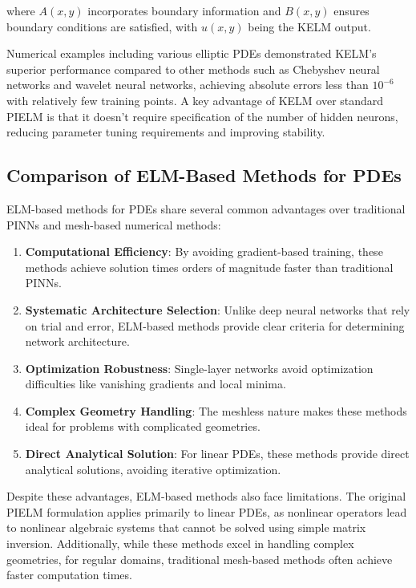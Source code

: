\documentclass[11pt]{article}
\begin{document}
where $A(x,y)$ incorporates boundary information and $B(x,y)$ ensures boundary conditions are satisfied, with $u(x,y)$ being the KELM output.

Numerical examples including various elliptic PDEs demonstrated KELM's superior performance compared to other methods such as Chebyshev neural networks and wavelet neural networks, achieving absolute errors less than $10^{-6}$ with relatively few training points. A key advantage of KELM over standard PIELM is that it doesn't require specification of the number of hidden neurons, reducing parameter tuning requirements and improving stability.

\subsection{Comparison of ELM-Based Methods for PDEs}

ELM-based methods for PDEs share several common advantages over traditional PINNs and mesh-based numerical methods:

\begin{enumerate}
    \item \textbf{Computational Efficiency}: By avoiding gradient-based training, these methods achieve solution times orders of magnitude faster than traditional PINNs.
    
    \item \textbf{Systematic Architecture Selection}: Unlike deep neural networks that rely on trial and error, ELM-based methods provide clear criteria for determining network architecture.
    
    \item \textbf{Optimization Robustness}: Single-layer networks avoid optimization difficulties like vanishing gradients and local minima.
    
    \item \textbf{Complex Geometry Handling}: The meshless nature makes these methods ideal for problems with complicated geometries.
    
    \item \textbf{Direct Analytical Solution}: For linear PDEs, these methods provide direct analytical solutions, avoiding iterative optimization.
\end{enumerate}

Despite these advantages, ELM-based methods also face limitations. The original PIELM formulation applies primarily to linear PDEs, as nonlinear operators lead to nonlinear algebraic systems that cannot be solved using simple matrix inversion. Additionally, while these methods excel in handling complex geometries, for regular domains, traditional mesh-based methods often achieve faster computation times.
\end{document}
